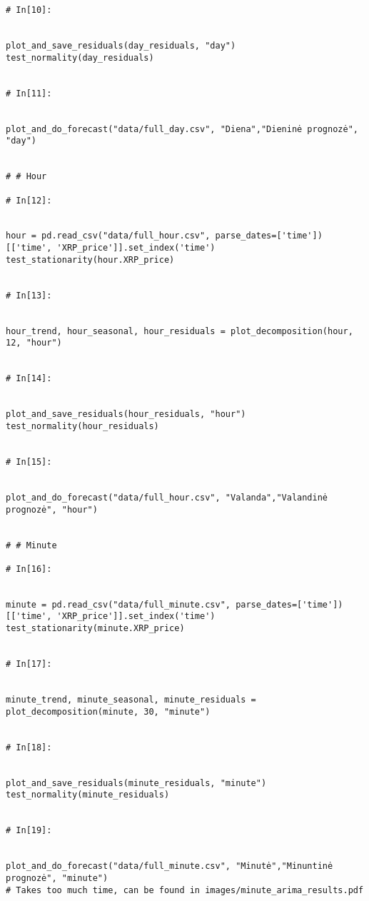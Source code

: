 \documentclass[12pt,a4paper]{article}
\begin{document}
\begin{lstlisting}[breaklines]
# In[10]:


plot_and_save_residuals(day_residuals, "day")
test_normality(day_residuals)


# In[11]:


plot_and_do_forecast("data/full_day.csv", "Diena","Dieninė prognozė", "day")


# # Hour

# In[12]:


hour = pd.read_csv("data/full_hour.csv", parse_dates=['time'])[['time', 'XRP_price']].set_index('time')
test_stationarity(hour.XRP_price)


# In[13]:


hour_trend, hour_seasonal, hour_residuals = plot_decomposition(hour, 12, "hour")


# In[14]:


plot_and_save_residuals(hour_residuals, "hour")
test_normality(hour_residuals)


# In[15]:


plot_and_do_forecast("data/full_hour.csv", "Valanda","Valandinė prognozė", "hour")


# # Minute

# In[16]:


minute = pd.read_csv("data/full_minute.csv", parse_dates=['time'])[['time', 'XRP_price']].set_index('time')
test_stationarity(minute.XRP_price)


# In[17]:


minute_trend, minute_seasonal, minute_residuals =  plot_decomposition(minute, 30, "minute")


# In[18]:


plot_and_save_residuals(minute_residuals, "minute")
test_normality(minute_residuals)


# In[19]:


plot_and_do_forecast("data/full_minute.csv", "Minutė","Minuntinė prognozė", "minute")
# Takes too much time, can be found in images/minute_arima_results.pdf


\end{lstlisting}
\end{document}
